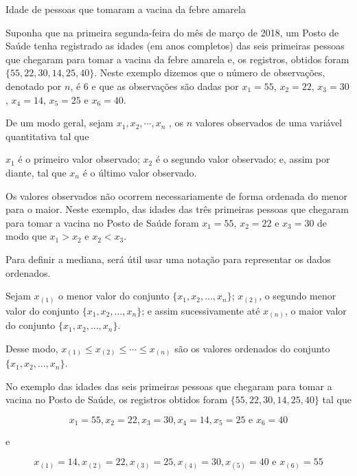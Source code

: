 \begin{example}{Idade de pessoas que tomaram a vacina da febre amarela}

Suponha que na primeira segunda-feira do mês de março de 2018, um Posto de Saúde tenha registrado as idades (em anos completos) das seis primeiras pessoas que chegaram para tomar a vacina da febre amarela e, os registros, obtidos foram \(\{55, 22, 30, 14, 25, 40\}\). Neste exemplo dizemos que o número de observações, denotado por \(n\), é \(6\) e que as observações são dadas por \(x_1=55\), \(x_2=22\), \(x_3=30\), \(x_4=14\), \(x_5=25\) e \(x_6=40\).

De um modo geral, sejam \(x_1,x_2, \cdots, x_n\) , os \(n\) valores observados de uma variável quantitativa tal que

\(x_1\) é o primeiro valor observado; \(x_2\) é o segundo valor observado; e, assim por diante, tal que \(x_n\) é o último valor observado.

Os valores observados não ocorrem necessariamente de forma ordenada do menor para o maior. Neste exemplo, das idades das três primeiras pessoas que chegaram para tomar a vacina no Posto de Saúde foram \(x_1=55\), \(x_2=22\) e \(x_3=30\) de modo que \(x_1>x_2\) e \(x_2<x_3\).

Para definir a mediana, será útil usar uma notação para representar os dados ordenados.

Sejam \(x_{(1)}\) o menor valor do conjunto \(\{ x_1,x_2,...,x_n\}\); \(x_{(2)}\), o segundo menor valor do conjunto \(\{ x_1,x_2,...,x_n\}\); e assim sucessivamente até \(x_{(n)}\), o maior valor do conjunto \(\{ x_1,x_2,...,x_n\}\).

Desse modo,
\(x_{(1)}\leq x_{(2)}\leq \cdots\leq x_{(n)}\) são os valores ordenados do conjunto \(\{ x_1,x_2,...,x_n\}\).

No exemplo das idades das seis primeiras pessoas que chegaram para tomar a vacina no Posto de Saúde, os registros obtidos foram \(\{55, 22, 30, 14, 25, 40\}\) tal que

$$x_1=55, x_2=22, x_3=30, x_4=14, x_5=25 \text{ e } x_6=40$$

e

$$x_{(1)}=14, x_{(2)}=22, x_{(3)}=25, x_{(4)}=30, x_{(5)}=40 \text{ e } x_{(6)}=55$$

\end{example}

